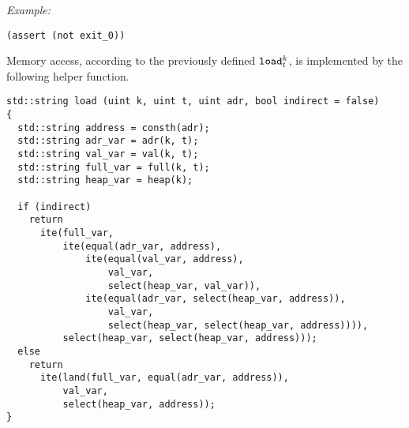\noindent
\emph{Example:} 

\begin{lstlisting}[style=smtlib]
(assert (not exit_0))
\end{lstlisting}



\noindent
Memory access, according to the previously defined $\texttt{load}^k_t$, is implemented by the following helper function.

\begin{lstlisting}[style=c++]
std::string load (uint k, uint t, uint adr, bool indirect = false)
{
  std::string address = consth(adr);
  std::string adr_var = adr(k, t);
  std::string val_var = val(k, t);
  std::string full_var = full(k, t);
  std::string heap_var = heap(k);

  if (indirect)
    return
      ite(full_var,
          ite(equal(adr_var, address),
              ite(equal(val_var, address),
                  val_var,
                  select(heap_var, val_var)),
              ite(equal(adr_var, select(heap_var, address)),
                  val_var,
                  select(heap_var, select(heap_var, address)))),
          select(heap_var, select(heap_var, address)));
  else
    return
      ite(land(full_var, equal(adr_var, address)),
          val_var,
          select(heap_var, address));
}
\end{lstlisting}

